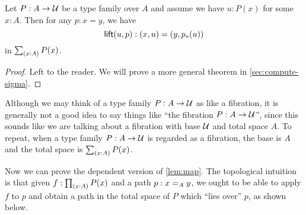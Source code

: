 \begin{lem}\label{thm:path-lifting}
  Let $P:A\to\type$ be a type family over $A$ and assume we have $u:P(x)$ for some $x:A$.
  Then for any $p:x=y$, we have
  \begin{equation*}
    \mathsf{lift}(u,p):(x,u)=(y,\trans{p}{u})
  \end{equation*}
  in $\sm{x:A}P(x)$.
\end{lem}
\begin{proof}
  Left to the reader.
  We will prove a more general theorem in \autoref{sec:compute-sigma}.
\end{proof}


\begin{rmk}
  Although we may think of a type family $P:A\to \type$ as like a fibration, it is generally not a good idea to say things like ``the fibration $P:A\to\type$'', since this sounds like we are talking about a fibration with base $\type$ and total space $A$.
  To repeat, when a type family $P:A\to \type$ is regarded as a fibration, the base is $A$ and the total space is $\sm{x:A} P(x)$.
\end{rmk}

Now we can prove the dependent version of \autoref{lem:map}.
The topological intuition is that given $f:\prd{x:A} P(x)$ and a path $p:\id[A]xy$, we ought to be able to apply $f$ to $p$ and obtain a path in the total space of $P$ which ``lies over'' $p$, as shown below.

